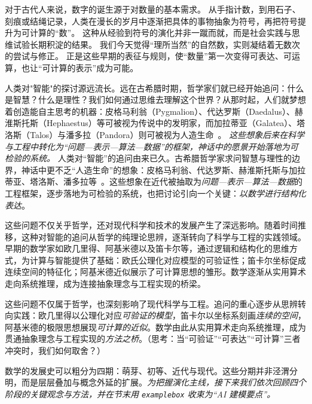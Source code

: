 对于古代人来说，数字的诞生源于对数量的基本需求。  
从手指计数，到用石子、刻痕或结绳记录，人类在漫长的岁月中逐渐把具体的事物抽象为符号，再把符号提升为可计算的“数”。  
这种从经验到符号的演化并非一蹴而就，而是社会实践与思维试验长期积淀的结果。  
我们今天觉得“理所当然”的自然数，实则凝结着无数次的尝试与修正。  
正是这些早期的表征与规则，使“数量”第一次变得可表达、可运算，也让“可计算的表示”成为可能。

人类对"智能"的探讨源远流长。远在古希腊时期，哲学家们就已经开始追问：什么是智慧？什么是理性？我们如何通过思维去理解这个世界？从那时起，人们就梦想着创造能自主思考的机器：皮格马利翁（Pygmalion）、代达罗斯（Daedalus）、赫淮斯托斯（Hephaestus）等可被视为传说中的发明家，而加拉蒂亚（Galatea）、塔洛斯（Talos）与潘多拉（Pandora）则可被视为人造生命~{\cite{OvidMartin2004,Sparkes1996,Tandy1997}}。 \emph{这些想象后来在科学与工程中转化为“问题—表示—算法—数据”的框架，神话中的愿景开始落地为可检验的系统。}
人类对“智能”的追问由来已久。古希腊哲学家求问智慧与理性的边界，神话中更不乏“人造生命”的想象：皮格马利翁、代达罗斯、赫淮斯托斯与加拉蒂亚、塔洛斯、潘多拉等~{\cite{OvidMartin2004,Sparkes1996,Tandy1997}}。这些想象在近代被抽取为\emph{问题—表示—算法—数据}的工程框架，逐步落地为可检验的系统，也把讨论引向一个关键：\emph{以数学进行结构化表达}。

这些问题不仅关乎哲学，还对现代科学和技术的发展产生了深远影响。随着时间推移，这种对智能的追问从哲学的纯理论思辨，逐渐转向了科学与工程的实践领域。早期的数学家如欧几里得、阿基米德以及笛卡尔等，通过逻辑和结构化的思维方式，为计算与智能提供了基础：欧氏公理化对应模型的可验证性；笛卡尔坐标促成连续空间的特征化；阿基米德近似展示了可计算思想的雏形。数学逐渐从实用算术走向系统推理，成为连接抽象理念与工程实现的桥梁。

这些问题不仅属于哲学，也深刻影响了现代科学与工程。追问的重心逐步从思辨转向实践：欧几里得以公理化对应\emph{可验证的模型}，笛卡尔以坐标系刻画\emph{连续的空间}，阿基米德的极限思想展现\emph{可计算的近似}。数学由此从实用算术走向系统推理，成为贯通抽象理念与工程实现的\emph{方法之桥}。（思考：当“可验证”“可表达”“可计算”三者冲突时，我们如何取舍？）

数学的发展史可以粗分为四期：萌芽、初等、近代与现代。这些分期并非泾渭分明，而是层层叠加与概念外延的扩展。\emph{为把握演化主线，接下来我们依次回顾四个阶段的关键观念与方法，并在节末用 \texttt{examplebox} 收束为“AI 建模要点”。}

